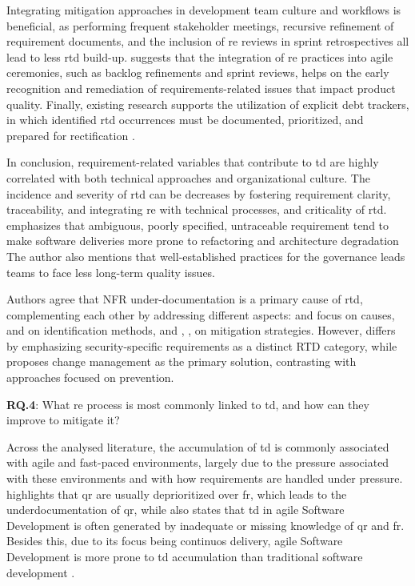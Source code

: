 \documentclass[12pt,reqno, twoside]{amsbook}
\theoremstyle{plain}
\numberwithin{equation}{chapter}
\numberwithin{section}{chapter}
\begin{document}
Integrating mitigation approaches in development team culture and workflows is beneficial, as performing frequent stakeholder meetings, recursive refinement of requirement documents, and the inclusion of \gls{re} reviews in sprint retrospectives all lead to less \gls{rtd} build-up. \textcite{Rios2020} suggests that the integration of \gls{re} practices into agile ceremonies, such as backlog refinements and sprint reviews, helps on the early recognition and remediation of requirements-related issues that impact product quality. Finally, existing research supports the utilization of explicit debt trackers, in which identified \gls{rtd} occurrences must be documented, prioritized, and prepared for rectification \parencite{Melo2022}.

In conclusion, requirement-related variables that contribute to \gls{td} are highly correlated with both technical approaches and organizational culture. The incidence and severity of \gls{rtd} can be decreases by fostering requirement clarity, traceability, and integrating \gls{re} with technical processes, and criticality of \gls{rtd}. \textcite{Melo2022} emphasizes that ambiguous, poorly specified, untraceable requirement tend to make software deliveries more prone to refactoring and architecture degradation The author also mentions that well-established practices for the governance leads teams to face less long-term quality issues.

Authors agree that NFR under-documentation is a primary cause of \gls{rtd}, complementing each other by addressing different aspects: \textcite{Farias2020} and \textcite{Behutiye2022} focus on causes, \textcite{Li2020} and \textcite{Lenarduzzi2019} on identification methods, and \textcite{Freire2020}, \textcite{Rios2020}, \textcite{Melo2022} on mitigation strategies. However, \textcite{Herath2025} differs by emphasizing security-specific requirements as a distinct RTD category, while \textcite{Villamizar2018} proposes change management as the primary solution, contrasting with approaches focused on prevention.

\hspace*{\linewidth}\par
\noindent\textbf{RQ.4}: 
What \gls{re} process is most commonly linked to \gls{td}, and how can they improve to mitigate it?\par

Across the analysed literature, the accumulation of \gls{td} is commonly associated with agile and fast-paced 
environments, largely due to the pressure associated with these environments and with how requirements are handled 
under pressure. \textcite{Behutiye2019} highlights that \gls{qr} are usually deprioritized over \gls{fr}, which 
leads to the underdocumentation of \gls{qr}, while also states that \gls{td} in agile Software Development is often 
generated by inadequate or missing knowledge of \gls{qr} and \gls{fr}.
Besides this, due to its focus being continuos delivery, agile Software Development is more prone to 
\gls{td} accumulation than traditional software development \parencite{Rios2019}.
\end{document}
